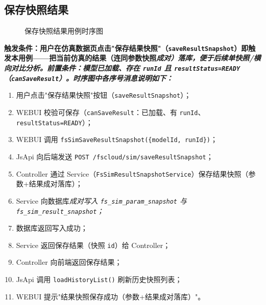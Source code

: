 \subsection{保存快照结果}
\begin{figure}[!h]
	\centering
	\resizebox{1.0\linewidth}{!}{}
	\caption{保存快照结果用例时序图}\label{fig:saveResultSnapshot}
\end{figure}
\bf{触发条件}：用户在仿真数据页点击"保存结果快照"（\texttt{saveResultSnapshot}）即触发本用例——把当前仿真的结果（连同参数快照\it{成对}）落库，便于后续单快照/横向对比分析。前置条件：模型已加载、存在 \texttt{runId} 且 \texttt{resultStatus=READY}（\texttt{canSaveResult}）。时序图中各序号消息说明如下：
\begin{enumerate}[label=\arabic*)]
	\item 用户点击"保存结果快照"按钮（\texttt{saveResultSnapshot}）；
	\item WEBUI 校验可保存（\texttt{canSaveResult}：已加载、有 \texttt{runId}、\texttt{resultStatus=READY}）；
	\item WEBUI 调用 \texttt{fsSimSaveResultSnapshot(\{modelId, runId\})}；
	\item JsApi 向后端发送 \texttt{POST /fscloud/sim/saveResultSnapshot}；
	\item Controller 通过 Service（\texttt{FsSimResultSnapshotService}）保存结果快照（参数+结果成对落库）；
	\item Service 向数据库\it{成对}写入 \texttt{fs\_sim\_param\_snapshot} 与 \texttt{fs\_sim\_result\_snapshot}；
	\item 数据库返回写入成功；
	\item Service 返回保存结果（快照 \texttt{id}）给 Controller；
	\item Controller 向前端返回保存结果；
	\item JsApi 调用 \texttt{loadHistoryList()} 刷新历史快照列表；
	\item WEBUI 提示"结果快照保存成功（参数+结果成对落库）"。
\end{enumerate}
\newpage

